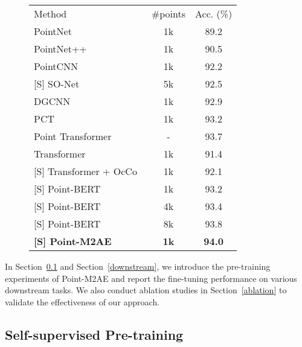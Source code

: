\documentclass{article}
\begin{document}
\begin{figure*}
\begin{minipage}[t!]{0.56\linewidth}
\label{modelnet_cls}
\begin{adjustbox}{width=\linewidth}
\centering
	\begin{tabular}{lcc}
	\toprule
Method &\#points  &Acc. (\%)\\
		\cmidrule(lr){1-1} \cmidrule(lr){2-2} \cmidrule(lr){3-3} 
PointNet~\cite{qi2017pointnet}  &1k &89.2 \\ 
        PointNet++~\cite{qi2017pointnet++}  &1k &90.5 \\
        PointCNN~\cite{li2018pointcnn}  &1k &92.2 \\
        {[S]} SO-Net~\cite{sonet}  &5k &92.5 \\
DGCNN~\cite{dgcnn}  &1k &92.9 \\
PCT~\cite{guo2021pct}  &1k &93.2 \\
Point Transformer~\cite{pointtransformer}  &- &93.7 \\
\cmidrule(lr){1-3}
Transformer~\cite{pointbert}  &1k &91.4\\
        {[S] Transformer + OcCo}~\cite{pointbert}  &1k &92.1\vspace{0.05cm}\\
        {[S] Point-BERT}~\cite{pointbert}  &1k &93.2\\
        {[S] Point-BERT}  &4k &93.4\\
        {[S] Point-BERT}  &8k &93.8\vspace{0.1cm}\\
        \rowcolor{gray!8}\textbf{[S] Point-M2AE}  &\textbf{1k} &\textbf{94.0}\vspace{0.1cm}\\
\bottomrule
	\end{tabular}
\end{adjustbox}
\end{minipage}
\end{figure*}


In Section~\ref{pretrain} and Section~\ref{downstream}, we introduce the pre-training experiments of Point-M2AE and report the fine-tuning performance on various downstream tasks. We also conduct ablation studies in Section~\ref{ablation} to validate the effectiveness of our approach.

\subsection{Self-supervised Pre-training}
\label{pretrain}
\end{document}
